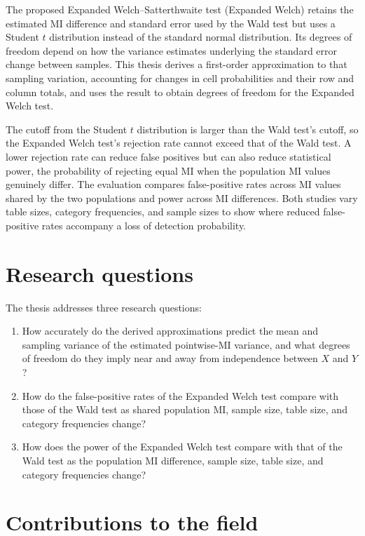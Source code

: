 The proposed Expanded Welch--Satterthwaite test (Expanded Welch) retains
the estimated MI difference and standard error used by the Wald test but uses a Student
\(t\) distribution instead of the standard normal distribution. Its degrees
of freedom depend on how the variance estimates underlying the standard
error change between samples. This thesis derives a first-order
approximation to that sampling variation, accounting for changes in cell
probabilities and their row and column totals, and uses the result to obtain
degrees of freedom for the Expanded Welch test.

The cutoff from the Student \(t\) distribution is larger than the Wald test's
cutoff, so the Expanded Welch test's rejection rate cannot exceed that of
the Wald test.
A lower rejection rate can reduce false positives but can also reduce
statistical power, the probability of
rejecting equal MI when the population MI values genuinely differ.
The evaluation compares false-positive rates across MI values shared by the
two populations and power across MI differences. Both studies vary table sizes,
category frequencies, and sample sizes to show where reduced false-positive rates
accompany a loss of detection probability.

\section{Research questions}
\label{sec:research-questions}

The thesis addresses three research questions:
\begin{enumerate}[label=\textbf{RQ\arabic*:},leftmargin=*]
 \item How accurately do the derived approximations predict the mean and
 sampling variance of the estimated pointwise-MI variance, and what degrees of
 freedom do they imply near and away from independence between \(X\) and \(Y\)?
 \item How do the false-positive rates of the Expanded Welch test compare with
 those of the Wald test
 as shared population MI, sample size, table size, and category frequencies
 change?
 \item How does the power of the Expanded Welch test compare with that of
 the Wald test as the
 population MI difference, sample size, table size, and category
 frequencies change?
\end{enumerate}

\section{Contributions to the field}

